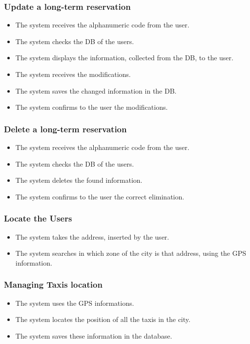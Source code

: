 		\subsubsection{Update a long-term reservation}
		\begin{itemize}
			\item The system receives the alphanumeric code from the user.
			\item The system checks the DB of the users.
			\item The system displays the information, collected from the DB, to the user.
			\item The system receives the modifications.
			\item The system saves the changed information in the DB.
			\item The system confirms to the user the modifications.
		\end{itemize}
		\subsubsection{Delete a long-term reservation}
		\begin{itemize}
			\item The system receives the alphanumeric code from the user.
			\item The system checks the DB of the users.
			\item The system deletes the found information.
			\item The system confirms to the user the correct elimination.
		\end{itemize}
		\subsubsection{Locate the Users}
		\begin{itemize}
			\item The system takes the address, inserted by the user.
			\item The system searches in which zone of the city is that address, using the GPS information.
		\end{itemize}		
		\subsubsection{Managing Taxis location}
		\begin{itemize}
			\item The system uses the GPS informations.
			\item The system locates the position of all the taxis in the city.
			\item The system saves these information in the database.
		\end{itemize}
